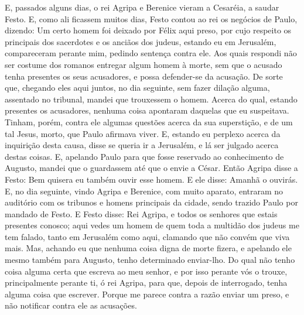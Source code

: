 E, passados alguns dias, o rei Agripa e Berenice vieram a
Cesaréia, a saudar Festo. E, como ali ficassem muitos dias,
Festo contou ao rei os negócios de Paulo, dizendo: Um certo homem
foi deixado por Félix aqui preso, por cujo respeito os
principais dos sacerdotes e os anciãos dos judeus, estando eu em
Jerusalém, compareceram perante mim, pedindo sentença contra ele.
Aos quais respondi não ser costume dos romanos entregar algum
homem à morte, sem que o acusado tenha presentes os seus acusadores,
e possa defender-se da acusação. De sorte que, chegando eles
aqui juntos, no dia seguinte, sem fazer dilação alguma, assentado no
tribunal, mandei que trouxessem o homem. Acerca do qual,
estando presentes os acusadores, nenhuma coisa apontaram daquelas
que eu suspeitava. Tinham, porém, contra ele algumas questões
acerca da sua superstição, e de um tal Jesus, morto, que Paulo
afirmava viver. E, estando eu perplexo acerca da inquirição
desta causa, disse se queria ir a Jerusalém, e lá ser julgado acerca
destas coisas. E, apelando Paulo para que fosse reservado ao
conhecimento de Augusto, mandei que o guardassem até que o envie a
César. Então Agripa disse a Festo: Bem quisera eu também
ouvir esse homem. E ele disse: Amanhã o ouvirás. E, no dia
seguinte, vindo Agripa e Berenice, com muito aparato, entraram no
auditório com os tribunos e homens principais da cidade, sendo
trazido Paulo por mandado de Festo. E Festo disse: Rei
Agripa, e todos os senhores que estais presentes conosco; aqui vedes
um homem de quem toda a multidão dos judeus me tem falado, tanto em
Jerusalém como aqui, clamando que não convém que viva mais.
Mas, achando eu que nenhuma coisa digna de morte fizera, e
apelando ele mesmo também para Augusto, tenho determinado
enviar-lho. Do qual não tenho coisa alguma certa que escreva
ao meu senhor, e por isso perante vós o trouxe, principalmente
perante ti, ó rei Agripa, para que, depois de interrogado, tenha
alguma coisa que escrever. Porque me parece contra a razão
enviar um preso, e não notificar contra ele as acusações.

\medskip


